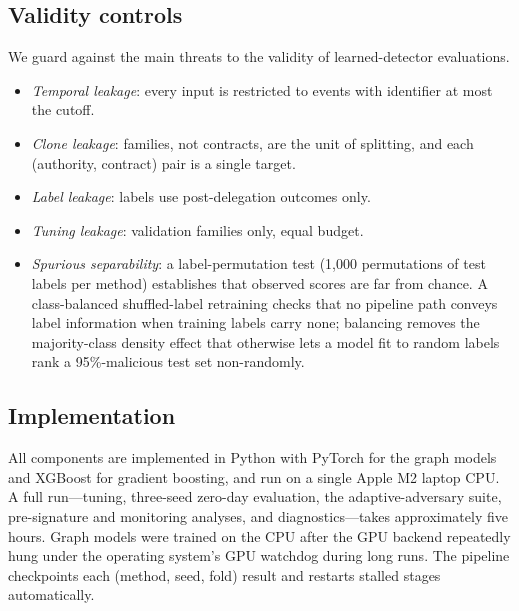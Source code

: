 \subsection{Validity controls}
We guard against the main threats to the validity of learned-detector evaluations.
\begin{itemize}
\item \emph{Temporal leakage}: every input is restricted to events with identifier at most the cutoff.
\item \emph{Clone leakage}: families, not contracts, are the unit of splitting, and each (authority, contract) pair is a single target.
\item \emph{Label leakage}: labels use post-delegation outcomes only.
\item \emph{Tuning leakage}: validation families only, equal budget.
\item \emph{Spurious separability}: a label-permutation test (1{,}000 permutations of test labels per method) establishes that observed scores are far from chance. A class-balanced shuffled-label retraining checks that no pipeline path conveys label information when training labels carry none; balancing removes the majority-class density effect that otherwise lets a model fit to random labels rank a 95\%-malicious test set non-randomly.
\end{itemize}

\subsection{Implementation}
All components are implemented in Python with PyTorch for the graph models and XGBoost for gradient boosting, and run on a single Apple M2 laptop CPU. A full run---tuning, three-seed zero-day evaluation, the adaptive-adversary suite, pre-signature and monitoring analyses, and diagnostics---takes approximately five hours. Graph models were trained on the CPU after the GPU backend repeatedly hung under the operating system's GPU watchdog during long runs. The pipeline checkpoints each (method, seed, fold) result and restarts stalled stages automatically.
